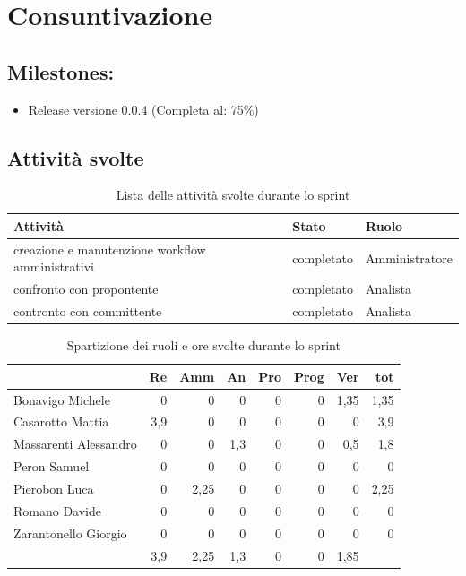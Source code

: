\section{Consuntivazione}

\subsection{Milestones:}
\begin{itemize}
    \item Release versione 0.0.4 (Completa al: 75\%)
\end{itemize}

\subsection{Attività svolte}

\begin{table}[ht]
    \begin{tabularx}{\textwidth}{X l l}
        
        \rowcolor{gray!30} \textbf{Attività} & \textbf{Stato} & \textbf{Ruolo}\\
        
        \hline
        creazione e manutenzione workflow amministrativi & completato & Amministratore\\
        confronto con propontente & completato & Analista\\
        contronto con committente & completato & Analista\\
        \end{tabularx}
    \caption{Lista delle attività svolte durante lo sprint}
\end{table}


\begin{table}[ht]
    \begin{tabularx}{\linewidth}{X|rrrrrrr}
    \rowcolor{gray!30}& Re & Amm & An & Pro & Prog & Ver & tot \\
    \hline
    Bonavigo Michele                        & 0 & 0 & 0 & 0 & 0 & 1,35  & 1,35 \\
    \rowcolor{gray!10}Casarotto Mattia      & 3,9 & 0 & 0 & 0 & 0 & 0  & 3,9 \\
    Massarenti Alessandro                   & 0 & 0 & 1,3 & 0 & 0 & 0,5  & 1,8 \\
    \rowcolor{gray!10}Peron Samuel          & 0 & 0 & 0 & 0 & 0 & 0 & 0 \\
    Pierobon Luca                           & 0 & 2,25 & 0 & 0 & 0 & 0 & 2,25 \\
    \rowcolor{gray!10}Romano Davide         & 0 & 0 & 0 & 0 & 0 & 0 & 0 \\
    Zarantonello Giorgio                    & 0 & 0 & 0 & 0 & 0 & 0 & 0 \\
    \hline                                  & 3,9 & 2,25 & 1,3 & 0 & 0 & 1,85 & 
    \end{tabularx}
    \caption{\label{ruoli-persone}Spartizione dei ruoli e ore svolte durante lo sprint}
\end{table}


